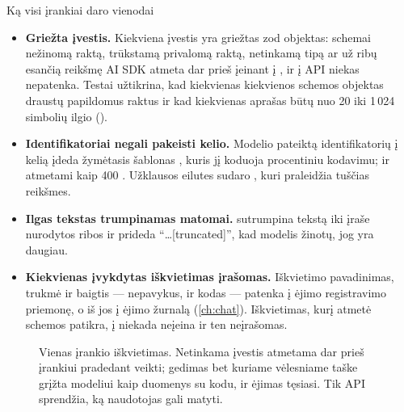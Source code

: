 \begin{codebox}{Ką visi įrankiai daro vienodai}
\begin{itemize}
  \item \textbf{Griežta įvestis.} Kiekviena įvestis yra griežtas zod objektas: schemai
    nežinomą raktą, trūkstamą privalomą raktą, netinkamą tipą ar už ribų esančią reikšmę AI SDK
    atmeta dar prieš įeinant į , ir į API niekas nepatenka. Testai užtikrina, kad
    kiekvienas kiekvienos schemos objektas draustų papildomus raktus ir kad kiekvienas aprašas
    būtų nuo 20 iki 1\,024 simbolių ilgio ().
  \item \textbf{Identifikatoriai negali pakeisti kelio.} Modelio pateiktą identifikatorių į
    kelią įdeda žymėtasis šablonas , kuris jį koduoja procentiniu kodavimu;
     ir  atmetami kaip 400 . Užklausos eilutes sudaro
    , kuri praleidžia tuščias reikšmes.
  \item \textbf{Ilgas tekstas trumpinamas matomai.}  sutrumpina tekstą iki
    įraše nurodytos ribos ir prideda \enquote{…[truncated]}, kad modelis žinotų, jog yra
    daugiau.
  \item \textbf{Kiekvienas įvykdytas iškvietimas įrašomas.} Iškvietimo pavadinimas, trukmė ir
    baigtis --- nepavykus, ir kodas --- patenka į ėjimo registravimo priemonę, o iš jos į ėjimo
    žurnalą (\cref{ch:chat}). Iškvietimas, kurį atmetė schemos patikra, į  niekada
    neįeina ir ten neįrašomas.
\end{itemize}
\end{codebox}

\begin{figure}[H]
\centering
{}
\actorlegend
\caption{Vienas įrankio iškvietimas. Netinkama įvestis atmetama dar prieš įrankiui pradedant
veikti; gedimas bet kuriame vėlesniame taške grįžta modeliui kaip duomenys su kodu, ir ėjimas
tęsiasi. Tik API sprendžia, ką naudotojas gali matyti.}\label{fig:tools:call}
\end{figure}

